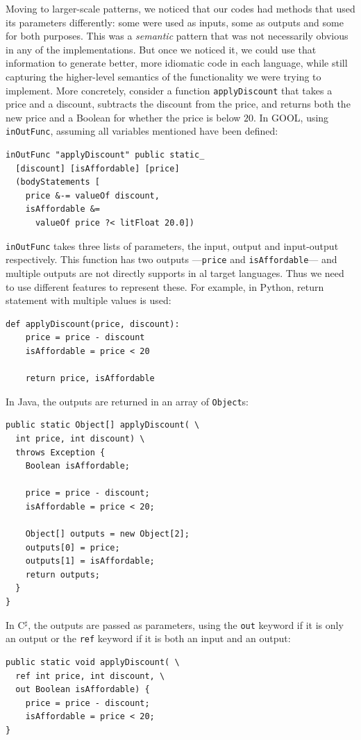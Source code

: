 \documentclass[sigplan,review,anonymous,prologue,dvipsnames]{acmart}
\newcommand{\Csharp}{C$^{\sharp}$}
\begin{document}
Moving to larger-scale patterns, we noticed that our codes had methods that
used its parameters differently: some were used as inputs, some as outputs
and some for both purposes.  This was a \emph{semantic} pattern that was
not necessarily obvious in any of the implementations. But once we noticed it,
we could use that information to generate better, more idiomatic code in
each language, while still capturing the higher-level semantics of the
functionality we were trying to implement.  More concretely, consider a
function \verb|applyDiscount| that takes a price and a discount, subtracts the
discount from the price, and returns both the new price and a Boolean for
whether the price is below $20$. In GOOL, using \verb|inOutFunc|, assuming
all variables mentioned have been defined:
\begin{lstlisting}
inOutFunc "applyDiscount" public static_
  [discount] [isAffordable] [price]
  (bodyStatements [
    price &-= valueOf discount,
    isAffordable &=
      valueOf price ?< litFloat 20.0])
\end{lstlisting}
\verb|inOutFunc| takes three lists of parameters, the input, output and
input-output respectively.  This function has two outputs
---\verb|price| and \verb|isAffordable|--- and multiple outputs are
not directly supports in al target languages.  Thus we need to use
different features to represent these.  For example, in Python,
return statement with multiple values is used:
\begin{lstlisting}
def applyDiscount(price, discount):
    price = price - discount
    isAffordable = price < 20

    return price, isAffordable
\end{lstlisting}
In Java, the outputs are returned in an array of \verb|Object|s:
\begin{lstlisting}
public static Object[] applyDiscount( \
  int price, int discount) \
  throws Exception {
    Boolean isAffordable;

    price = price - discount;
    isAffordable = price < 20;

    Object[] outputs = new Object[2];
    outputs[0] = price;
    outputs[1] = isAffordable;
    return outputs;
  }
}
\end{lstlisting}
In \Csharp, the outputs are passed as parameters, using the \verb|out| keyword if
it is only an output or the \verb|ref| keyword if it is both an input and an
output:
\begin{lstlisting}
public static void applyDiscount( \
  ref int price, int discount, \
  out Boolean isAffordable) {
    price = price - discount;
    isAffordable = price < 20;
}
\end{lstlisting}
\end{document}
